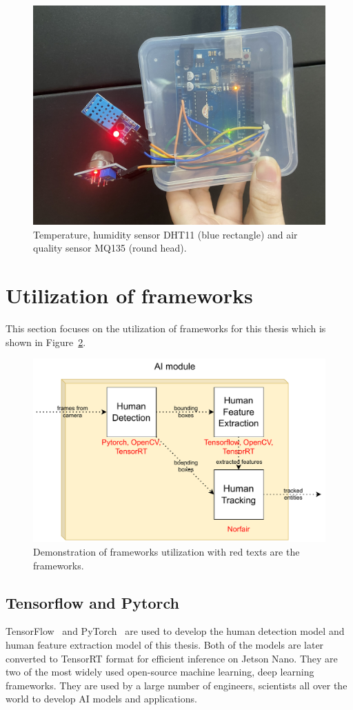 \documentclass[../main.tex]{subfiles}
\begin{document}
\begin{figure}[h!]
\centering
\includegraphics[width=0.8\linewidth]{Figure/sensor.jpg}
\caption{Temperature, humidity sensor DHT11 (blue rectangle) and air quality sensor MQ135 (round head).}
\label{fig:sensor}
\end{figure}

\section{Utilization of frameworks}
This section focuses on the utilization of frameworks for this thesis which is shown in Figure~\ref{fig:framework}.

\begin{figure}[h!]
\centering
\includegraphics[width=0.9\linewidth]{Figure/framework.pdf}
\caption{Demonstration of frameworks utilization with red texts are the frameworks.}
\label{fig:framework}
\end{figure}

\subsection{Tensorflow and Pytorch}
TensorFlow~\cite{tensorflow} and PyTorch~\cite{pytorch} are used to develop the human detection model and human feature extraction model of this thesis. Both of the models are later converted to TensorRT format for efficient inference on Jetson Nano. They are two of the most widely used open-source machine learning, deep learning frameworks. They are used by a large number of engineers, scientists all over the world to develop AI models and applications.
\end{document}
